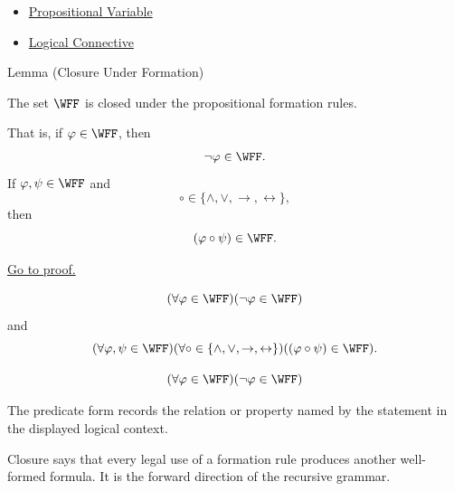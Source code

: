 \begin{dependencies}
\begin{itemize}
  \item \hyperref[def:propositional-variable]{Propositional Variable}
  \item \hyperref[def:logical-connective]{Logical Connective}
\end{itemize}
\end{dependencies}
\begin{lemmabox}{Lemma (Closure Under Formation)}
\begin{lemma}
\label{lem:closure-under-formation-propositional-formulas}
The set \(\WFF\) is closed under the propositional formation rules.

That is, if \(\varphi\in\WFF\), then
\[
\neg\varphi\in\WFF.
\]
If \(\varphi,\psi\in\WFF\) and
\[
\circ\in\{\land,\lor,\to,\leftrightarrow\},
\]
then
\[
(\varphi\circ\psi)\in\WFF.
\]

\noindent\hyperref[prf:closure-under-formation-propositional-formulas]{Go to proof.}
\end{lemma}
\end{lemmabox}
\begin{remark*}
\[
(\forall\varphi\in\WFF)(\neg\varphi\in\WFF)
\]
and
\[
(\forall\varphi,\psi\in\WFF)
(\forall\circ\in\{\land,\lor,\to,\leftrightarrow\})
((\varphi\circ\psi)\in\WFF).
\]
\end{remark*}

\begin{remark*}
\[
  (\forall\varphi\in\WFF)(\neg\varphi\in\WFF)
\]

The predicate form records the relation or property named by the statement in
the displayed logical context.
\end{remark*}


\begin{remark*}[Interpretation]
Closure says that every legal use of a formation rule produces another
well-formed formula. It is the forward direction of the recursive grammar.
\end{remark*}


